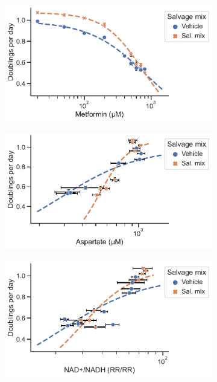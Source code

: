 \begin{figure}[ht]
     \centering
     \begin{subfigure}[b]{0.49\textwidth}
         \includegraphics[width=\textwidth]{figures/chap2/app/HCT116_Met_Met_vs_prlfr.pdf}
         \caption{}
         \label{fig:app_ch2:HCT116_Met_Met_vs_prlfr}
     \end{subfigure}
     \hspace{0.255\textwidth}
     \begin{subfigure}[b]{0.49\textwidth}
         \includegraphics[width=\textwidth]{figures/chap2/app/HCT116_Met_Asp_vs_prlfr.pdf}
         \caption{}
         \label{fig:app_ch2:HCT116_Met_Asp_vs_prlfr}
     \end{subfigure}
     \hfill
     \begin{subfigure}[b]{0.49\textwidth}
         \includegraphics[width=\textwidth]{figures/chap2/app/HCT116_Met_NAD_vs_prlfr.pdf}

\end{subfigure}
\end{figure}

